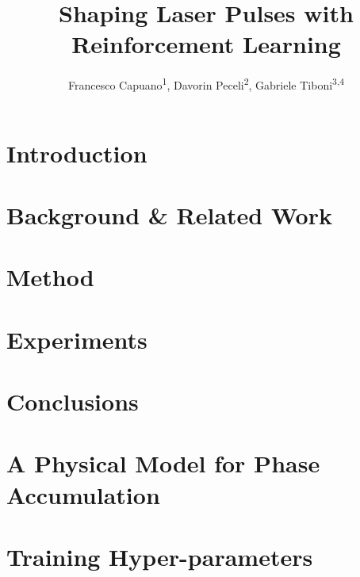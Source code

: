 \documentclass[10pt,table]{article}
\title{Shaping Laser Pulses with Reinforcement Learning}
\author{
Francesco Capuano\textsuperscript{1},
Davorin Peceli\textsuperscript{2},
Gabriele Tiboni\textsuperscript{3,4}
}
\begin{document}
\makeCover  %
\maketitle  %

\begin{abstract}

\end{abstract}

\section{Introduction}
\label{sec:introduction}


\section{Background \& Related Work}
\label{sec:background}


\section{Method}
\label{sec:method}


\section{Experiments}
\label{sec:experiments}


\section{Conclusions}
\label{sec:discussion}



\appendix

\section{A Physical Model for Phase Accumulation}\label{app:physics}


\section{Training Hyper-parameters}\label{app:hyperparams}





\end{document}

